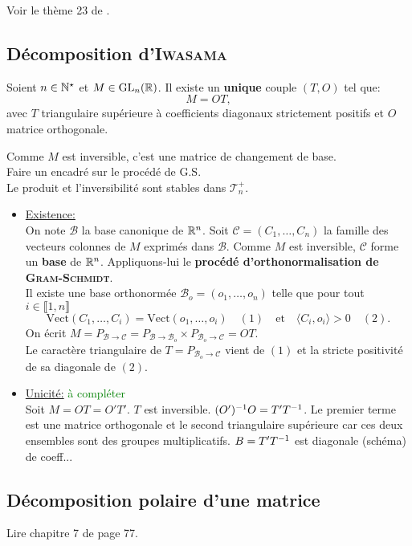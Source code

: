 Voir le thème 23 de \cite{acamanes}.
\subsection{Décomposition d'\textsc{Iwasama}}
\begin{tcolorbox}
    Soient $n \in \mathbb{N}^\star$ et $M \in \mathrm{GL}_n(\mathbb{R})$. Il existe un \textbf{unique} couple $(T, O)$ tel que:
    $$M = OT,$$
    avec $T$ triangulaire supérieure à coefficients diagonaux strictement positifs et $O$ matrice orthogonale. 
\end{tcolorbox}

Comme $M$ est inversible, c'est une matrice de changement de base. \\
Faire un encadré sur le procédé de G.S. \\
Le produit et l'inversibilité sont stables dans $\mathscr{T}_n^+$.

\begin{itemize}
    \item \underline{Existence:} \\
    On note $\mathscr{B}$ la base canonique de $\mathbb{R}^n$. Soit $\mathscr{C} = (C_1, \dots, C_n)$ la famille des vecteurs colonnes de $M$ exprimés dans $\mathscr{B}$. Comme $M$ est inversible, $\mathscr{C}$ forme un \textbf{base} de $\mathbb{R}^n$. Appliquons-lui le \textbf{procédé d'orthonormalisation de \textsc{Gram}-\textsc{Schmidt}}. \\
    Il existe une base orthonormée $\mathscr{B}_o = (o_1, \dots, o_n)$ telle que pour tout $i \in \llbracket 1, n \rrbracket$
    $$\mathrm{Vect}(C_1, \dots, C_i) = \mathrm{Vect}(o_1,\dots, o_i) \quad (1) \quad \text{et} \quad \langle C_i, o_i \rangle > 0 \quad (2).$$
    On écrit $M = P_{\mathscr{B} \to \mathscr{C}} = P_{\mathscr{B} \to \mathscr{B}_o} \times P_{\mathscr{B}_o \to \mathscr{C}} = OT$. \\
    Le caractère triangulaire de $T = P_{\mathscr{B}_o \to \mathscr{C}}$ vient de $(1)$ et la stricte positivité de sa diagonale de $(2)$.
    \item \underline{Unicité:} \textcolor{green}{à compléter} \\
    Soit $M = OT = O'T'$. $T$ est inversible. $(O')^{-1}O =T'T^{-1}$. Le premier terme est une matrice orthogonale et le second triangulaire supérieure car ces deux ensembles sont des groupes multiplicatifs. $B = T'T^{-1}$ est diagonale (schéma) de coeff...
\end{itemize} 

\subsection{Décomposition polaire d'une matrice}
Lire chapitre 7 de \cite{matrices} page 77.